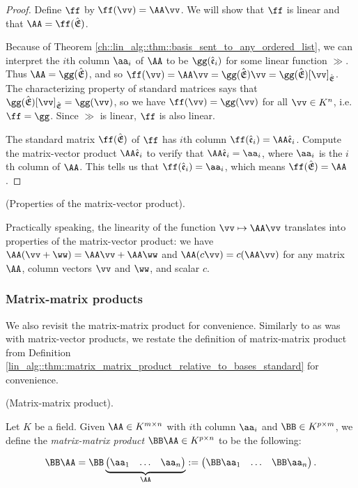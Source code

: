 \begin{proof}
    Define $\ff$ by $\ff(\vv) = \AA \vv$. We will show that $\ff$ is linear and that $\AA = \ff(\sE)$.

    Because of Theorem \ref{ch::lin_alg::thm::basis_sent_to_any_ordered_list}, we can interpret the $i$th column $\aa_i$ of $\AA$ to be $\gg(\see_i)$ for some linear function $\gg$. Thus $\AA = \gg(\sE)$, and so $\ff(\vv) = \AA \vv = \gg(\sE) \vv = \gg(\sE) [\vv]_\sE$. The characterizing property of standard matrices says that $\gg(\sE) [\vv]_\sE = \gg(\vv)$, so we have $\ff(\vv) = \gg(\vv)$ for all $\vv \in K^n$, i.e. $\ff = \gg$. Since $\gg$ is linear, $\ff$ is also linear.
    
    The standard matrix $\ff(\sE)$ of $\ff$ has $i$th column $\ff(\see_i) = \AA \see_i$. Compute the matrix-vector product $\AA \see_i$ to verify that $\AA \see_i = \aa_i$, where $\aa_i$ is the $i$th column of $\AA$. This tells us that $\ff(\see_i) = \aa_i$, which means $\ff(\sE) = \AA$.
    
\end{proof}

\begin{theorem}
    (Properties of the matrix-vector product).
    
    Practically speaking, the linearity of the function $\vv \mapsto \AA \vv$ translates into properties of the matrix-vector product: we have $\AA(\vv + \ww) = \AA \vv + \AA \ww$ and $\AA(c\vv) = c(\AA \vv)$ for any matrix $\AA$, column vectors $\vv$ and $\ww$, and scalar $c$. 
\end{theorem}

\subsubsection{Matrix-matrix products}

We also revisit the matrix-matrix product for convenience. Similarly to as was with matrix-vector products, we restate the definition of matrix-matrix product from Definition \ref{lin_alg::thm::matrix_matrix_product_relative_to_bases_standard} for convenience.

\begin{defn}
    (Matrix-matrix product).

    Let $K$ be a field. Given $\AA \in K^{m \times n}$ with $i$th column $\aa_i$ and $\BB \in K^{p \times m}$, we define the \textit{matrix-matrix product} $\BB \AA \in K^{p \times n}$ to be the following:

    \begin{align*}
        \BB \AA = \BB \underbrace{\begin{pmatrix} \aa_1 & \hdots & \aa_n \end{pmatrix}}_\AA := 
        \begin{pmatrix} \BB \aa_1 & \hdots & \BB \aa_n \end{pmatrix}.
    \end{align*}
\end{defn}

